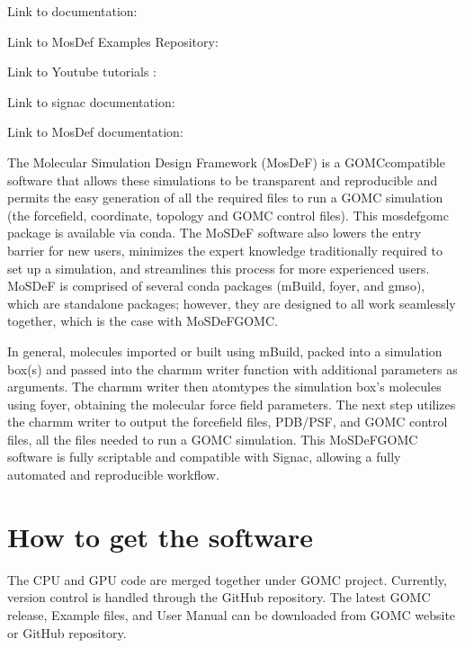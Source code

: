 \documentclass[letterpaper,10pt,english]{sphinxmanual}
\begin{document}
\sphinxAtStartPar
Link to documentation: 

\sphinxAtStartPar
Link to MosDef Examples Repository: 

\sphinxAtStartPar
Link to Youtube tutorials : 

\sphinxAtStartPar
Link to signac documentation: 

\sphinxAtStartPar
Link to MosDef documentation: 

\sphinxAtStartPar
The Molecular Simulation Design Framework (MosDeF) is a GOMC\sphinxhyphen{}compatible software that allows these simulations to be transparent and reproducible and permits the easy generation of all the required files to run a GOMC simulation (the forcefield, coordinate, topology and GOMC control files).  This mosdef\sphinxhyphen{}gomc package is available via conda.  The MoSDeF software also lowers the entry barrier for new users, minimizes the expert knowledge traditionally required to set up a simulation, and streamlines this process for more experienced users.  MoSDeF is comprised of several conda packages (mBuild, foyer, and gmso), which are stand\sphinxhyphen{}alone packages; however, they are designed to all work seamlessly together, which is the case with MoSDeF\sphinxhyphen{}GOMC.

\sphinxAtStartPar
In general, molecules imported or built using mBuild,  packed into a simulation box(s) and passed into the charmm writer function with additional parameters as arguments.  The charmm writer then atom\sphinxhyphen{}types the simulation box’s molecules using foyer, obtaining the molecular force field parameters.  The next step utilizes the charmm writer to output the forcefield files, PDB/PSF, and GOMC control files, all the files needed to run a GOMC simulation.  This MoSDeF\sphinxhyphen{}GOMC software is fully scriptable and compatible with Signac, allowing a fully automated and reproducible workflow.


\chapter{How to get the software}
\label{\detokenize{download:how-to-get-the-software}}\label{\detokenize{download::doc}}
\sphinxAtStartPar
The CPU and GPU code are merged together under GOMC project. Currently, version control is handled through the GitHub repository. The latest GOMC release, Example files, and User Manual can be downloaded from GOMC website or GitHub repository.
\end{document}
